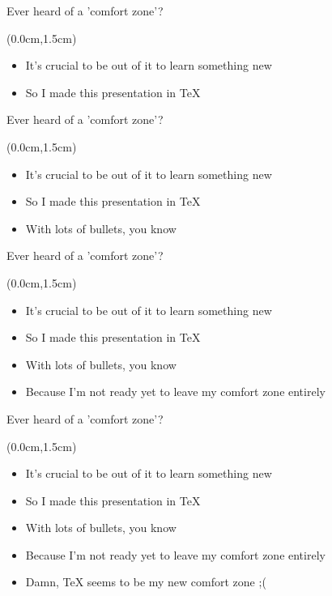 \documentclass[xetex,14pt,aspectratio=169]{beamer}
\begin{document}
\begin{frame}{Ever heard of a 'comfort zone'?}
\begin{textblock*}{\framewidth-0.8cm}(0.0cm,1.5cm) %
\begin{itemize}
  \item It's crucial to be out of it to learn something new
  \item So I made this presentation in TeX
\end{itemize}
\end{textblock*}
\end{frame}

\begin{frame}{Ever heard of a 'comfort zone'?}
\begin{textblock*}{\framewidth-0.8cm}(0.0cm,1.5cm) %
\begin{itemize}
  \item It's crucial to be out of it to learn something new
  \item So I made this presentation in TeX
  \item With lots of bullets, you know
\end{itemize}
\end{textblock*}
\end{frame}

\begin{frame}{Ever heard of a 'comfort zone'?}
\begin{textblock*}{\framewidth-0.8cm}(0.0cm,1.5cm) %
\begin{itemize}
  \item It's crucial to be out of it to learn something new
  \item So I made this presentation in TeX
  \item With lots of bullets, you know
  \item Because I'm not ready yet to leave my comfort zone entirely
\end{itemize}
\end{textblock*}
\end{frame}

\begin{frame}{Ever heard of a 'comfort zone'?}
\begin{textblock*}{\framewidth-0.8cm}(0.0cm,1.5cm) %
\begin{itemize}
  \item It's crucial to be out of it to learn something new
  \item So I made this presentation in TeX
  \item With lots of bullets, you know
  \item Because I'm not ready yet to leave my comfort zone entirely
  \item Damn, TeX seems to be my new comfort zone ;(
\end{itemize}
\end{textblock*}
\end{frame}
\end{document}
